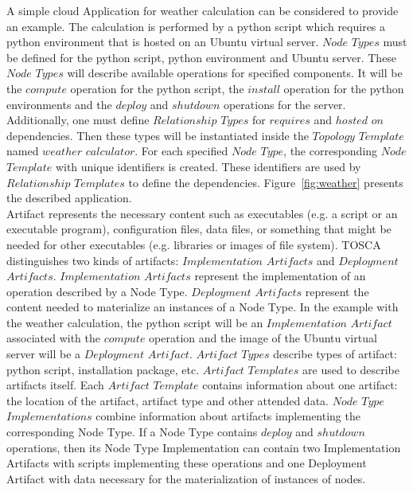A simple cloud Application for weather calculation can be considered to provide an example. 
The calculation is performed by a python script which requires a python environment that is hosted on an Ubuntu virtual server.
$Node$ $Types$ must be defined for the python script, python environment and Ubuntu server.  
These $Node$ $Types$ will describe available operations for specified components.
It will be the $compute$ operation for the python script, the $install$ operation for the python environments and the $deploy$ and $shutdown$ operations for the server.
Additionally, one must define $Relationship$ $Types$ for $requires$ and $hosted$ $on$ dependencies.
Then these types will be instantiated inside the $Topology$ $Template$ named $weather$ $calculator$.
For each specified $Node$ $Type$, the corresponding $Node$ $Template$ with unique identifiers is created.
These identifiers are used by $Relationship$ $Templates$ to define the dependencies.
Figure~\ref{fig:weather} presents the described application. \\
Artifact represents the necessary content such as executables (e.g. a script or an executable program), configuration files, data files, or something that might be needed for other executables (e.g. libraries or images of file system).
TOSCA distinguishes two kinds of artifacts: $Implementation$ $Artifacts$ and $Deployment$ $Artifacts$.
$Implementation$ $Artifacts$ represent the implementation of an operation described by a Node Type.
$Deployment$ $Artifacts$ represent the content needed to materialize an instances of a Node Type.
In the example with the weather calculation, the python script will be an $Implementation$ $Artifact$ associated with the $compute$ operation and the image of the Ubuntu virtual server will be a $Deployment$ $Artifact$.
$Artifact$ $Types$ describe types of artifact: python script, installation package, etc.
$Artifact$ $Templates$ are used to describe artifacts itself.
Each $Artifact$ $Template$ contains information about one artifact: the location of the artifact, artifact type and other attended data. 
$Node$ $Type$ $Implementations$ combine information about artifacts implementing the corresponding Node Type.
If a Node Type contains $deploy$ and $shutdown$ operations, then its Node Type Implementation can contain two Implementation Artifacts with scripts implementing these operations and one Deployment Artifact with data necessary for the materialization of instances of nodes. %
